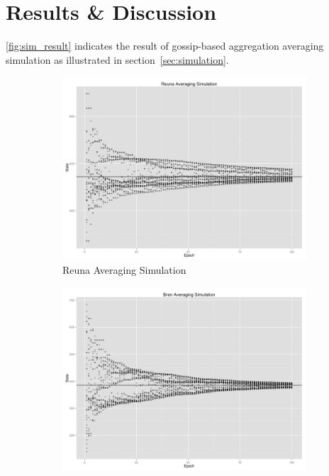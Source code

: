 \section{Results \& Discussion}
\ref{fig:sim_result} indicates the result of gossip-based aggregation averaging simulation as illustrated in section~\ref{sec:simulation}. 
\begin{figure}[h!]
	\centering
    \begin{subfigure}[t]{0.47\textwidth}
    \vspace{0pt}
    \includegraphics[width=\linewidth]{figures/Simulation_averaging/ReunaAvgSim.png}
    \caption{Reuna Averaging Simulation}
    \end{subfigure}
    \begin{subfigure}[t]{0.47\textwidth}
    \vspace{0pt}
    \includegraphics[width=\linewidth]{figures/Simulation_averaging/BrenAvgSim.png}

\end{subfigure}
\end{figure}
